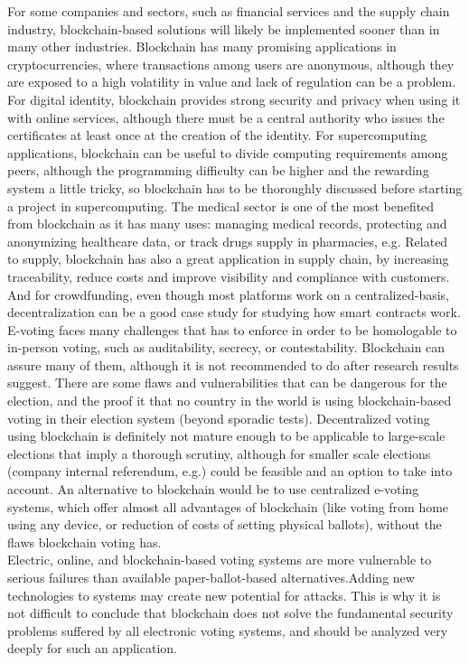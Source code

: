 \documentclass[10pt]{article}
\begin{document}
\begin{multicols}{2}
For some companies and sectors, such as financial services and the supply chain industry, blockchain-based solutions will likely be implemented sooner than in many other industries. Blockchain has many promising applications in cryptocurrencies, where transactions among users are anonymous, although they are exposed to a high volatility in value and lack of regulation can be a problem. For digital identity, blockchain provides strong security and privacy when using it with online services, although there must be a central authority who issues the certificates at least once at the creation of the identity. For supercomputing applications, blockchain can be useful to divide computing requirements among peers, although the programming difficulty can be higher and the rewarding system a little tricky, so blockchain has to be thoroughly discussed before starting a project in supercomputing. The medical sector is one of the most benefited from blockchain as it has many uses: managing medical records, protecting and anonymizing healthcare data, or track drugs supply in pharmacies, e.g. Related to supply, blockchain has also a great application in supply chain, by increasing traceability, reduce costs and improve visibility and compliance with customers. And for crowdfunding, even though most platforms work on a centralized-basis, decentralization can be a good case study for studying how smart contracts work.\\

E-voting faces many challenges that has to enforce in order to be homologable to in-person voting, such as auditability, secrecy, or contestability. Blockchain can assure many of them, although it is not recommended to do after research results suggest. There are some flaws and vulnerabilities that can be dangerous for the election, and the proof it that no country in the world is using blockchain-based voting in their election system (beyond sporadic tests). Decentralized voting using blockchain is definitely not mature enough to be applicable to large-scale elections that imply a thorough scrutiny, although for smaller scale elections (company internal referendum, e.g.) could be feasible and an option to take into account. An alternative to blockchain would be to use centralized e-voting systems, which offer almost all advantages of blockchain (like voting from home using any device, or reduction of costs of setting physical ballots), without the flaws blockchain voting has.\\

Electric, online, and blockchain-based voting systems are more vulnerable to serious failures than available paper-ballot-based alternatives.Adding new technologies to systems may create new potential for attacks. This is why it is not difficult to conclude that blockchain does not solve the fundamental security problems suffered by all electronic voting systems, and should be analyzed very deeply for such an application.\\


\end{multicols}
\end{document}
